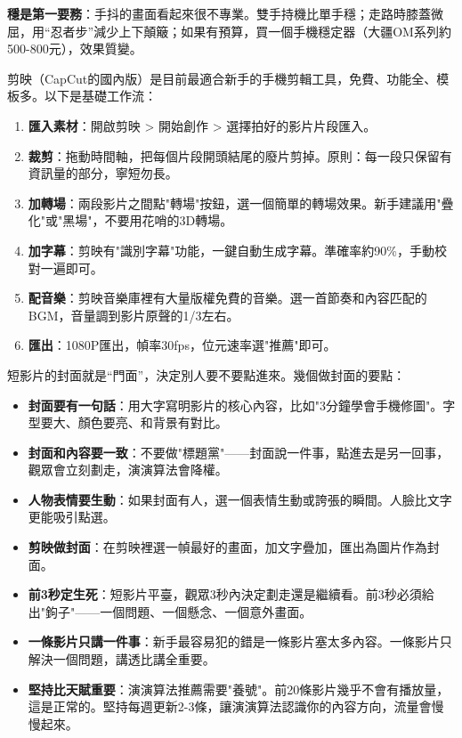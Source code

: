 \textbf{穩是第一要務}：手抖的畫面看起來很不專業。雙手持機比單手穩；走路時膝蓋微屈，用“忍者步”減少上下顛簸；如果有預算，買一個手機穩定器（大疆OM系列約500-800元），效果質變。


剪映（CapCut的國內版）是目前最適合新手的手機剪輯工具，免費、功能全、模板多。以下是基礎工作流：

\begin{enumerate}
  \item \textbf{匯入素材}：開啟剪映 > 開始創作 > 選擇拍好的影片片段匯入。
  \item \textbf{裁剪}：拖動時間軸，把每個片段開頭結尾的廢片剪掉。原則：每一段只保留有資訊量的部分，寧短勿長。
  \item \textbf{加轉場}：兩段影片之間點"轉場"按鈕，選一個簡單的轉場效果。新手建議用"疊化"或"黑場"，不要用花哨的3D轉場。
  \item \textbf{加字幕}：剪映有"識別字幕"功能，一鍵自動生成字幕。準確率約90\%，手動校對一遍即可。
  \item \textbf{配音樂}：剪映音樂庫裡有大量版權免費的音樂。選一首節奏和內容匹配的BGM，音量調到影片原聲的1/3左右。
  \item \textbf{匯出}：1080P匯出，幀率30fps，位元速率選"推薦"即可。
\end{enumerate}


短影片的封面就是“門面”，決定別人要不要點進來。幾個做封面的要點：

\begin{itemize}
  \item \textbf{封面要有一句話}：用大字寫明影片的核心內容，比如"3分鐘學會手機修圖"。字型要大、顏色要亮、和背景有對比。
  \item \textbf{封面和內容要一致}：不要做"標題黨"——封面說一件事，點進去是另一回事，觀眾會立刻劃走，演演算法會降權。
  \item \textbf{人物表情要生動}：如果封面有人，選一個表情生動或誇張的瞬間。人臉比文字更能吸引點選。
  \item \textbf{剪映做封面}：在剪映裡選一幀最好的畫面，加文字疊加，匯出為圖片作為封面。
\end{itemize}


\begin{itemize}
  \item \textbf{前3秒定生死}：短影片平臺，觀眾3秒內決定劃走還是繼續看。前3秒必須給出"鉤子"——一個問題、一個懸念、一個意外畫面。
  \item \textbf{一條影片只講一件事}：新手最容易犯的錯是一條影片塞太多內容。一條影片只解決一個問題，講透比講全重要。
  \item \textbf{堅持比天賦重要}：演演算法推薦需要"養號"。前20條影片幾乎不會有播放量，這是正常的。堅持每週更新2-3條，讓演演算法認識你的內容方向，流量會慢慢起來。
\end{itemize}

